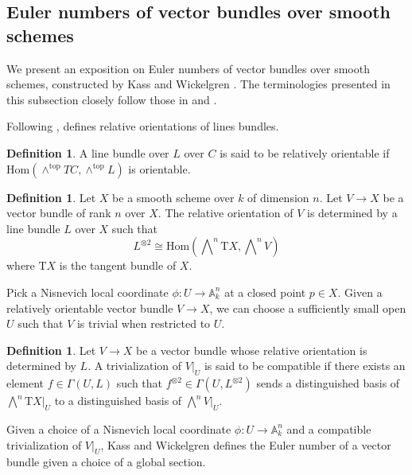 \documentclass[12pt, reqno]{amsart}
\theoremstyle{definition}
\newtheorem{definition}[theorem]{Definition}
\newcommand{\A}{\mathbb{A}} %
\newcommand{\Hom}{\text{Hom}}
\begin{document}
\subsection{Euler numbers of vector bundles over smooth schemes}\label{subsec: Euler numbers}

 We present an exposition on Euler numbers of vector bundles over smooth schemes, constructed by Kass and Wickelgren \cite{kwcubic}. The terminologies presented in this subsection closely follow those in \cite[Section 4]{kwcubic} and \cite[Section 4]{AWS}.

Following \cite{okotel14}, \cite{kwcubic} defines relative orientations of lines bundles.
\begin{definition}{\cite[Definition 17]{kwcubic}}
A line bundle over $L$ over $C$ is said to be relatively orientable if $\Hom(\wedge^{\text{top}} TC, \wedge^{\text{top}} L)$ is orientable.
\end{definition}

\begin{definition} \cite[Definition 17]{kwcubic}
Let $X$ be a smooth scheme over $k$ of dimension $n$. Let $V \to X$ be a vector bundle of rank $n$ over $X$. The relative orientation of $V$ is determined by a line bundle $L$ over $X$ such that 
\begin{equation*}
    L^{\otimes 2} \cong \text{Hom} \left( \bigwedge\nolimits^n \text{T}X, \bigwedge\nolimits^n V \right)
\end{equation*}
where $\text{T}X$ is the tangent bundle of $X$.
\end{definition}

Pick a Nisnevich local coordinate $\phi: U \to \A^n_k$ at a closed point $p \in X$. Given a relatively orientable vector bundle $V \to X$, we can choose a sufficiently small open $U$ such that $V$ is trivial when restricted to $U$. 
\begin{definition} \cite[Definition 21]{kwcubic}
Let $V \to X$ be a vector bundle whose relative orientation is determined by $L$. A trivialization of $V|_U$ is said to be compatible if there exists an element $f \in \Gamma(U,L)$ such that $f^{\otimes 2} \in \Gamma(U, L^{\otimes 2})$ sends a distinguished basis of $\bigwedge\nolimits^n \text{T}X|_U$ to a distinguished basis of $\bigwedge\nolimits^n V|_U$. 
\end{definition}

Given a choice of a Nisnevich local coordinate $\phi: U \to \A^n_k$ and a compatible trivialization of $V|_U$, Kass and Wickelgren defines the Euler number of a vector bundle given a choice of a global section. 
\end{document}
